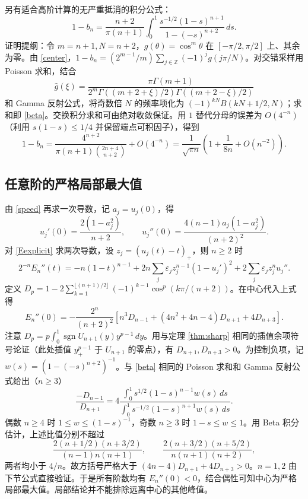 \documentclass[11pt,a4paper,fontset=fandol]{ctexart}
\newcommand{\sgn}{\operatorname{sgn}}
\theoremstyle{remark}\newtheorem{conjecture}{猜想}
\begin{document}
另有适合高阶计算的无严重抵消的积分公式：
\begin{equation}\label{beta}
 1-b_n=\frac{n+2}{\pi(n+1)}\int_0^1\frac{s^{-1/2}(1-s)^{n+1}}{1-(-s)^{n+2}}\,ds.
\end{equation}
证明提纲：令 $m=n+1,N=n+2$，$g(\theta)=\cos^m\theta$ 在 $[-\pi/2,\pi/2]$ 上、其余为零。由 \eqref{center}，$1-b_n=(2^{m-1}/m)\sum_{j\in\mathbb Z}(-1)^jg(j\pi/N)$。对交错采样用 Poisson 求和，结合
\[
 \widehat g(\xi)=\frac{\pi\Gamma(m+1)}{2^m\Gamma((m+2+\xi)/2)\Gamma((m+2-\xi)/2)}
\]
和 Gamma 反射公式，将奇数倍 $N$ 的频率项化为 $(-1)^{kN}B(kN+1/2,N)$；求和即 \eqref{beta}。交换积分求和可由绝对收敛保证。用 $1$ 替代分母的误差为 $O(4^{-n})$（利用 $s(1-s)\le1/4$ 并保留端点可积因子），得到
\begin{equation}\label{asym}
 1-b_n=\frac{4^{n+2}}{\pi(n+1)\binom{2n+4}{n+2}}+O(4^{-n})
 =\frac{1}{\sqrt{\pi n}}\left(1+\frac1{8n}+O(n^{-2})\right).
\end{equation}

\subsection{任意阶的严格局部最大值}
由 \eqref{speed} 再求一次导数，记 $a_j=u_j(0)$，得
\[
 u_j'(0)=\frac{2(1-a_j^2)}{n+2},\qquad
 u_j''(0)=\frac{4(n-1)a_j(1-a_j^2)}{(n+2)^2}.
\]
对 \eqref{Eexplicit} 求两次导数，设 $z_j=(u_j(t)-t)_+$，则 $n\ge2$ 时
\[
 2^{-n}E_n''(t)=-n(1-t)^{n-1}+2n\sum_j\varepsilon_jz_j^{n-1}(1-u_j')^2+2\sum_j\varepsilon_jz_j^nu_j''.
\]
定义 $D_p=1-2\sum_{k=1}^{\lfloor(n+1)/2\rfloor}(-1)^{k-1}\cos^p(k\pi/(n+2))$。在中心代入上式得
\[
 E_n''(0)=-\frac{2^n}{(n+2)^2}\left[n^3 D_{n-1}+(4n^2+4n-4)D_{n+1}+4D_{n+3}\right].
\]
注意 $D_p=p\int_0^1\sgn U_{n+1}(y)y^{p-1}\,dy$。用与定理 \ref{thm:sharp} 相同的插值余项符号论证（此处插值 $y_+^{p-1}$ 于 $U_{n+1}$ 的零点），有 $D_{n+1},D_{n+3}>0$。为控制负项，记 $w(s)=(1-(-s)^{n+2})^{-1}$。与 \eqref{beta} 相同的 Poisson 求和和 Gamma 反射公式给出（$n\ge3$）
\[
 \frac{-D_{n-1}}{D_{n+1}}=4\frac{\int_0^1s^{1/2}(1-s)^{n-1}w(s)\,ds}{\int_0^1s^{-1/2}(1-s)^{n+1}w(s)\,ds}.
\]
偶数 $n\ge4$ 时 $1\le w\le(1-s)^{-1}$，奇数 $n\ge3$ 时 $1-s\le w\le1$。用 Beta 积分估计，上述比值分别不超过
\[
 \frac{2(n+1/2)(n+3/2)}{(n-1)n(n+1)},\qquad
 \frac{2(n+3/2)(n+5/2)}{n(n+1)(n+2)},
\]
两者均小于 $4/n$。故方括号严格大于 $(4n-4)D_{n+1}+4D_{n+3}>0$。$n=1,2$ 由下节公式直接验证。于是所有阶数均有 $E_n''(0)<0$，结合偶性可知中心为严格局部最大值。局部结论并不能排除远离中心的其他峰值。
\end{document}

